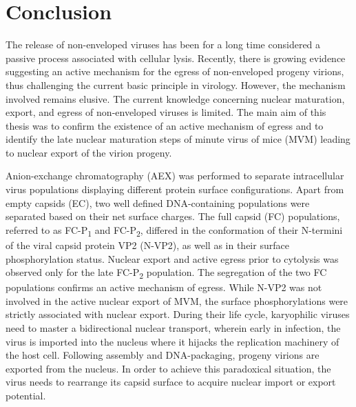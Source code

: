 
\chapter*{Conclusion} %

\label{Conclusion} %


\graphicspath{{./Pictures/}}

\newcommand*\circled[1]{\tikz[baseline=(char.base)]{\node[shape=circle,draw,black,inner sep=0.3pt] (char) {#1};}}

The release of non-enveloped viruses has been for a long time considered a passive process associated with cellular lysis. Recently, there is growing evidence suggesting an active mechanism for the egress of non-enveloped progeny virions, thus challenging the current basic principle in virology. However, the mechanism involved remains elusive. The current knowledge concerning nuclear maturation, export, and egress of non-enveloped viruses is limited. The main aim of this thesis was to confirm the existence of an active mechanism of egress and to identify the late nuclear maturation steps of minute virus of mice (MVM) leading to nuclear export of the virion progeny. 
    
\par
\medskip
Anion-exchange chromatography (AEX) was performed to separate intracellular virus populations displaying different protein surface configurations. Apart from empty capsids (EC), two well defined DNA-containing populations were separated based on their net surface charges. The full capsid (FC) populations, referred to as FC-P\textsubscript{1} and FC-P\textsubscript{2}, differed in the conformation of their N-termini of the viral capsid protein VP2 (N-VP2), as well as in their surface phosphorylation status. Nuclear export and active egress prior to cytolysis was observed only for the late FC-P\textsubscript{2} population. The segregation of the two FC populations confirms an active mechanism of egress. While N-VP2 was not involved in the active nuclear export of MVM, the surface phosphorylations were strictly associated with nuclear export. During their life cycle, karyophilic viruses need to master a bidirectional nuclear transport, wherein early in infection, the virus is imported into the nucleus where it hijacks the replication machinery of the host cell. Following assembly and DNA-packaging, progeny virions are exported from the nucleus. In order to achieve this paradoxical situation, the virus needs to rearrange its capsid surface to acquire nuclear import or export potential. 



